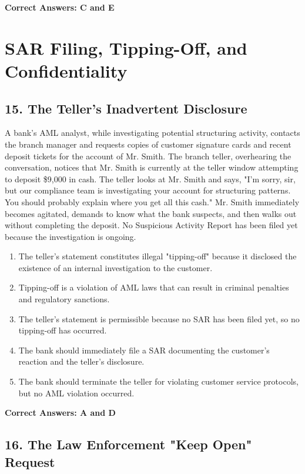 \documentclass[11pt,a4paper]{article}
\begin{document}
	\textbf{Correct Answers: C and E}
	
	\section{SAR Filing, Tipping-Off, and Confidentiality}
	
	\subsection{15. The Teller's Inadvertent Disclosure}
	
	A bank's AML analyst, while investigating potential structuring activity, contacts the branch manager and requests copies of customer signature cards and recent deposit tickets for the account of Mr. Smith. The branch teller, overhearing the conversation, notices that Mr. Smith is currently at the teller window attempting to deposit \$9,000 in cash. The teller looks at Mr. Smith and says, "I'm sorry, sir, but our compliance team is investigating your account for structuring patterns. You should probably explain where you get all this cash." Mr. Smith immediately becomes agitated, demands to know what the bank suspects, and then walks out without completing the deposit. No Suspicious Activity Report has been filed yet because the investigation is ongoing.
	
	\begin{enumerate}[label=\Alph*.]
		\item The teller's statement constitutes illegal "tipping-off" because it disclosed the existence of an internal investigation to the customer.
		\item Tipping-off is a violation of AML laws that can result in criminal penalties and regulatory sanctions.
		\item The teller's statement is permissible because no SAR has been filed yet, so no tipping-off has occurred.
		\item The bank should immediately file a SAR documenting the customer's reaction and the teller's disclosure.
		\item The bank should terminate the teller for violating customer service protocols, but no AML violation occurred.
	\end{enumerate}
	
	\textbf{Correct Answers: A and D}
	
	\subsection{16. The Law Enforcement "Keep Open" Request}
	
\end{document}
